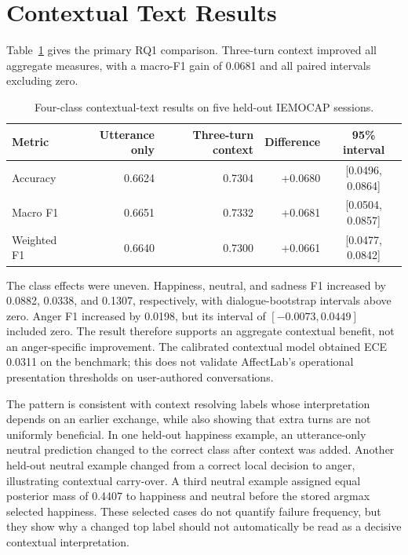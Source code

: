 \section{Contextual Text Results}
\label{sec:context-text-results}

Table~\ref{tab:context-text-results} gives the primary RQ1 comparison. Three-turn context improved all aggregate measures, with a macro-F1 gain of 0.0681 and all paired intervals excluding zero.

\begin{table}[htbp]
\centering
\caption{Four-class contextual-text results on five held-out IEMOCAP sessions.}
\label{tab:context-text-results}
\footnotesize
\begin{tabular}{|l|r|r|r|c|}
\hline
\textbf{Metric} & \textbf{Utterance only} & \textbf{Three-turn context} & \textbf{Difference} & \textbf{95\% interval} \\ \hline
Accuracy & 0.6624 & 0.7304 & +0.0680 & [0.0496, 0.0864] \\ \hline
Macro F1 & 0.6651 & 0.7332 & +0.0681 & [0.0504, 0.0857] \\ \hline
Weighted F1 & 0.6640 & 0.7300 & +0.0661 & [0.0477, 0.0842] \\ \hline
\end{tabular}
\end{table}

The class effects were uneven. Happiness, neutral, and sadness F1 increased by 0.0882, 0.0338, and 0.1307, respectively, with dialogue-bootstrap intervals above zero. Anger F1 increased by 0.0198, but its interval of $[-0.0073,0.0449]$ included zero. The result therefore supports an aggregate contextual benefit, not an anger-specific improvement. The calibrated contextual model obtained ECE 0.0311 on the benchmark; this does not validate AffectLab's operational presentation thresholds on user-authored conversations.

The pattern is consistent with context resolving labels whose interpretation depends on an earlier exchange, while also showing that extra turns are not uniformly beneficial. In one held-out happiness example, an utterance-only neutral prediction changed to the correct class after context was added. Another held-out neutral example changed from a correct local decision to anger, illustrating contextual carry-over. A third neutral example assigned equal posterior mass of 0.4407 to happiness and neutral before the stored argmax selected happiness. These selected cases do not quantify failure frequency, but they show why a changed top label should not automatically be read as a decisive contextual interpretation.

